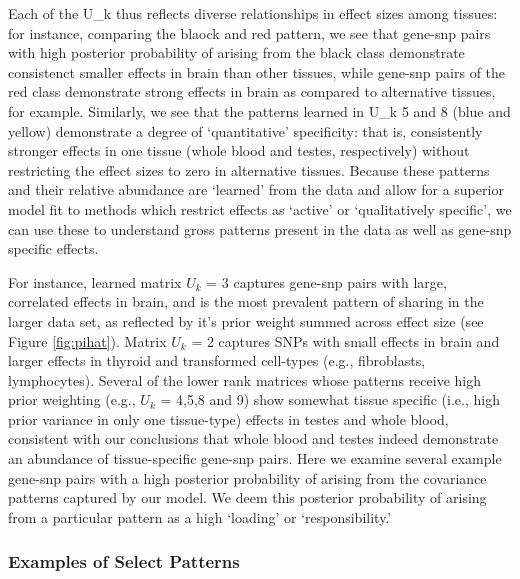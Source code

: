 Each of the U_{k} thus reflects diverse relationships in effect sizes among tissues: for instance, comparing the blaock and red pattern, we see that gene-snp pairs with high posterior probability of arising from the black class demonstrate consistenct smaller effects in brain than other tissues, while gene-snp pairs of the red class demonstrate strong effects in brain as compared to alternative tissues, for example. Similarly, we see that the patterns learned in U_{k} 5 and 8 (blue and yellow) demonstrate a degree of `quantitative' specificity: that is, consistently stronger effects in one tissue (whole blood and testes, respectively) without restricting the effect sizes to zero in alternative tissues. Because these patterns and their relative abundance are `learned' from the data and allow for a superior model fit to methods which restrict effects as `active' or `qualitatively specific', we can use these to understand gross patterns present in the data as well as gene-snp specific effects.


For instance, learned matrix $U_{k}$ = 3 captures gene-snp pairs with large, correlated effects in brain, and is the most prevalent pattern of sharing in the larger data set, as reflected by it's prior weight summed across effect size (see Figure \ref{fig:pihat}). Matrix $U_{k}$ = 2 captures SNPs with small effects in brain and larger effects in thyroid and transformed cell-types (e.g., fibroblasts, lymphocytes). Several of the lower rank matrices whose patterns receive high prior weighting (e.g., $U_{k}$ = 4,5,8 and 9) show somewhat tissue specific (i.e., high prior variance in only one tissue-type) effects in testes and whole blood, consistent with our conclusions that whole blood and testes indeed demonstrate an abundance of tissue-specific gene-snp pairs. Here we examine several example gene-snp pairs with a high posterior probability of arising from the covariance patterns captured by our model. We deem this posterior probability of arising from a particular pattern as a high `loading' or `responsibility.' 


\subsubsection{Examples of Select Patterns}

